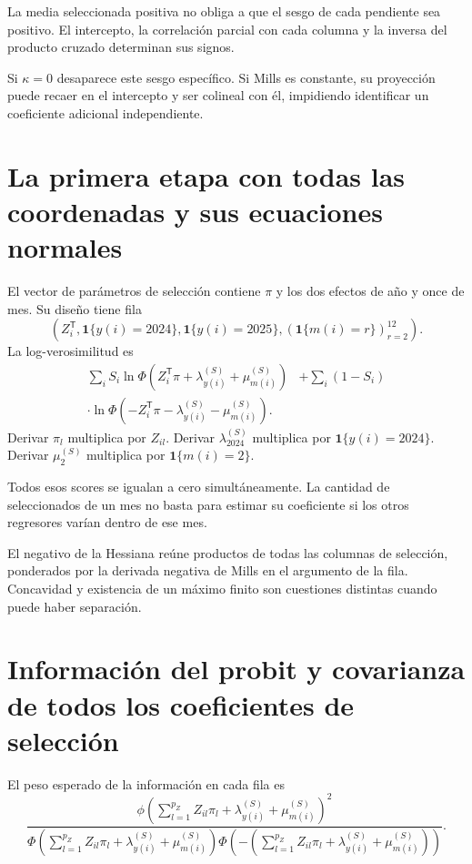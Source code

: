 \documentclass[11pt,a4paper]{article}
\begin{document}
La media seleccionada positiva no obliga a que el sesgo de cada pendiente sea positivo. El intercepto, la correlación parcial con cada columna y la inversa del producto cruzado determinan sus signos.

Si $\kappa=0$ desaparece este sesgo específico. Si Mills es constante, su proyección puede recaer en el intercepto y ser colineal con él, impidiendo identificar un coeficiente adicional independiente.

\clearpage
\section{La primera etapa con todas las coordenadas y sus ecuaciones normales}

El vector de parámetros de selección contiene $\pi$ y los dos efectos de año y once de mes. Su diseño tiene fila
\[
\left(Z_i^{\mathsf T},\mathbf1\{y(i)=2024\},\mathbf1\{y(i)=2025\},
(\mathbf1\{m(i)=r\})_{r=2}^{12}\right).
\]
La log-verosimilitud es
\[
\begin{aligned}
\sum_iS_i\ln\Phi(Z_i^{\mathsf T}\pi+\lambda_{y(i)}^{(S)}+\mu_{m(i)}^{(S)})
&+\sum_i(1-S_i)\\
\cdot\ln\Phi(-Z_i^{\mathsf T}\pi-\lambda_{y(i)}^{(S)}-\mu_{m(i)}^{(S)}).
\end{aligned}
\]
Derivar $\pi_l$ multiplica por $Z_{il}$. Derivar $\lambda_{2024}^{(S)}$ multiplica por $\mathbf1\{y(i)=2024\}$. Derivar $\mu_2^{(S)}$ multiplica por $\mathbf1\{m(i)=2\}$.

Todos esos scores se igualan a cero simultáneamente. La cantidad de seleccionados de un mes no basta para estimar su coeficiente si los otros regresores varían dentro de ese mes.

El negativo de la Hessiana reúne productos de todas las columnas de selección, ponderados por la derivada negativa de Mills en el argumento de la fila. Concavidad y existencia de un máximo finito son cuestiones distintas cuando puede haber separación.

\clearpage
\section{Información del probit y covarianza de todos los coeficientes de selección}
El peso esperado de la información en cada fila es
\[
\frac{\phi(\sum_{l=1}^{p_Z}Z_{il}\pi_l+\lambda_{y(i)}^{(S)}+\mu_{m(i)}^{(S)})^2}{\Phi(\sum_{l=1}^{p_Z}Z_{il}\pi_l+\lambda_{y(i)}^{(S)}+\mu_{m(i)}^{(S)})\Phi(-(\sum_{l=1}^{p_Z}Z_{il}\pi_l+\lambda_{y(i)}^{(S)}+\mu_{m(i)}^{(S)}))}.
\]
\end{document}
